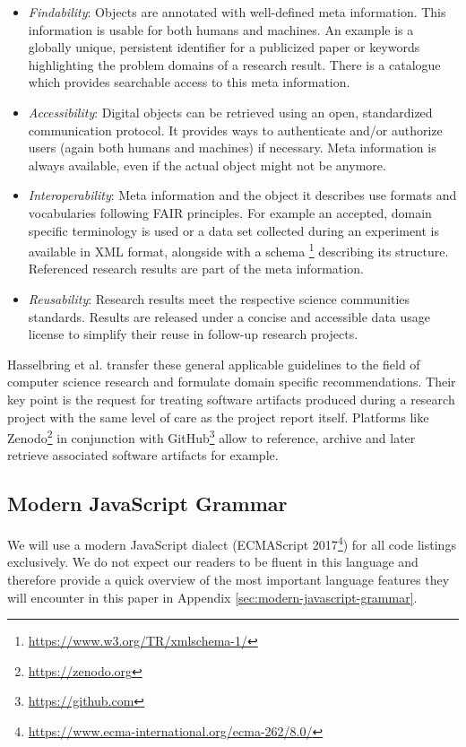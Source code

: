 \documentclass[12pt,a4paper]{article}
\begin{document}
\begin{itemize}
	\item \emph{Findability}: Objects are annotated with well-defined meta information. This information is usable for both humans and machines. An example is a globally unique, persistent identifier for a publicized paper or keywords highlighting the problem domains of a research result. There is a catalogue which provides searchable access to this meta information.
	\item \emph{Accessibility}: Digital objects can be retrieved using an open, standardized communication protocol. It provides ways to authenticate and/or authorize users (again both humans and machines) if necessary. Meta information is always available, even if the actual object might not be anymore.
	\item \emph{Interoperability}: Meta information and the object it describes use formats and vocabularies following FAIR principles. For example an accepted, domain specific terminology is used or a data set collected during an experiment is available in XML format, alongside with a schema \footnote{\url{https://www.w3.org/TR/xmlschema-1/}} describing its structure. Referenced research results are part of the meta information.
	\item \emph{Reusability}: Research results meet the respective science communities standards. Results are released under a concise and accessible data usage license to simplify their reuse in follow-up research projects.
\end{itemize}

Hasselbring et al. \cite{2019arXiv190805986H} transfer these general applicable guidelines to the field of computer science research and formulate domain specific recommendations. Their key point is the request for treating software artifacts produced during a research project with the same level of care as the project report itself. Platforms like Zenodo\footnote{\url{https://zenodo.org}} in conjunction with GitHub\footnote{\url{https://github.com}} allow to reference, archive and later retrieve associated software artifacts for example.

\subsection{Modern JavaScript Grammar}
We will use a modern JavaScript dialect (ECMAScript 2017\footnote{\url{https://www.ecma-international.org/ecma-262/8.0/}}) for all code listings exclusively. We do not expect our readers to be fluent in this language and therefore provide a quick overview of the most important language features they will encounter in this paper in Appendix \ref{sec:modern-javascript-grammar}.
\end{document}
